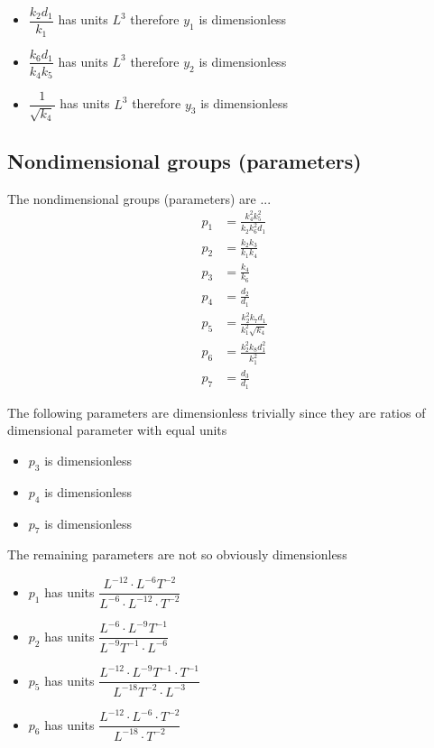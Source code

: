 \documentclass[10pt,letterpaper]{article}
\begin{document}
\begin{itemize}
  \item $\dfrac{k_2 d_1}{k_1}$ has units $L^3$ therefore $y_1$ is dimensionless
  \item $\dfrac{k_6 d_1}{k_4 k_5}$ has units $L^3$ therefore $y_2$ is dimensionless
  \item $\dfrac{1}{\sqrt{k_4}}$ has units $L^3$ therefore $y_3$ is dimensionless
\end{itemize}


\subsection{Nondimensional groups (parameters)}

The nondimensional groups (parameters) are ...
\begin{equation}
\begin{aligned}
p_1 &= \frac{k_4^2 k_5^2}{k_2 k_6^2 d_1} \\
p_2 &= \frac{k_2 k_3}{k_1 k_4} \\
p_3 &= \frac{k_4}{k_6} \\
p_4 &= \frac{d_2}{d_1} \\
p_5 &= \frac{k_2^2 k_7 d_1}{k_1^2 \sqrt{k_4}} \\
p_6 &= \frac{k_2^2 k_8 d_1^2}{k_1^2} \\
p_7 &= \frac{d_3}{d_1} 
\end{aligned}
\end{equation}

The following parameters are dimensionless trivially since they are ratios of dimensional parameter with equal units
\begin{itemize}
  \item $p_3$ is dimensionless
  \item $p_4$ is dimensionless
  \item $p_7$ is dimensionless
\end{itemize}
The remaining parameters are not so obviously dimensionless
\begin{itemize}
  \item $p_1$ has units $\dfrac{L^{-12}\cdot L^{-6}T^{-2}}               {L^{-6} \cdot L^{-12} \cdot T^{-2}}$ 
  \item $p_2$ has units $\dfrac{L^{-6} \cdot L^{-9}T^{-1}}               {L^{-9} T^{-1} \cdot L^{-6}}$
  \item $p_5$ has units $\dfrac{L^{-12}\cdot L^{-9}T^{-1} \cdot T^{-1} } {L^{-18} T^{-2} \cdot L^{-3}}$
  \item $p_6$ has units $\dfrac{L^{-12}\cdot L^{-6} \cdot T^{-2}}        {L^{-18}\cdot T^{-2}}$
\end{itemize}
\end{document}
